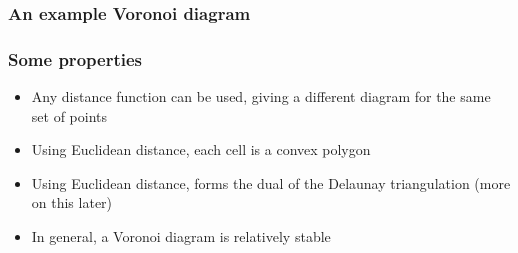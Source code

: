 \documentclass{beamer}
\begin{document}
\begin{frame}
  \frametitle{An example Voronoi diagram}
  \begin{center}
  \end{center}
\end{frame}

\begin{frame}
  \frametitle{Some properties}
  \begin{itemize}[<+->]
  \item Any distance function can be used, giving a different diagram for the same set of points
    \vspace{\baselineskip}
  \item Using Euclidean distance, each cell is a convex polygon
    \vspace{\baselineskip}
  \item Using Euclidean distance, forms the dual of the Delaunay triangulation (more on this later)
    \vspace{\baselineskip}
  \item In general, a Voronoi diagram is relatively stable
  \end{itemize}
\end{frame}
\end{document}
